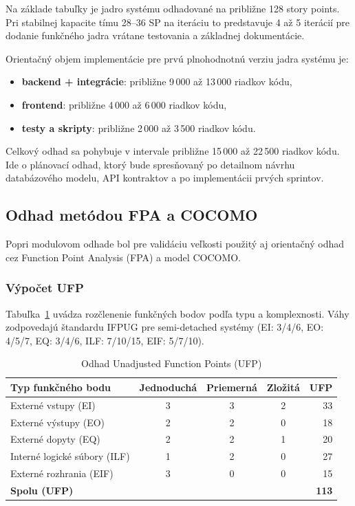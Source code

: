 Na základe tabuľky je jadro systému odhadované na približne 128 story points. Pri stabilnej kapacite tímu 28--36 SP na iteráciu to predstavuje 4 až 5 iterácií pre dodanie funkčného jadra vrátane testovania a základnej dokumentácie.

Orientačný objem implementácie pre prvú plnohodnotnú verziu jadra systému je:

\begin{itemize}
\item \textbf{backend + integrácie}: približne 9\,000 až 13\,000 riadkov kódu,
\item \textbf{frontend}: približne 4\,000 až 6\,000 riadkov kódu,
\item \textbf{testy a skripty}: približne 2\,000 až 3\,500 riadkov kódu.
\end{itemize}

Celkový odhad sa pohybuje v intervale približne 15\,000 až 22\,500 riadkov kódu. Ide o plánovací odhad, ktorý bude spresňovaný po detailnom návrhu databázového modelu, API kontraktov a po implementácii prvých sprintov.

\subsection{Odhad metódou FPA a COCOMO}

Popri modulovom odhade bol pre validáciu veľkosti použitý aj orientačný odhad cez Function Point Analysis (FPA) a model COCOMO.

\subsubsection*{Výpočet UFP}

Tabuľka~\ref{tab:ufp} uvádza rozčlenenie funkčných bodov podľa typu a komplexnosti. Váhy zodpovedajú štandardu IFPUG pre semi-detached systémy (EI: 3/4/6, EO: 4/5/7, EQ: 3/4/6, ILF: 7/10/15, EIF: 5/7/10).

\begin{table}[htbp]
\centering
\caption{Odhad Unadjusted Function Points (UFP)}
\label{tab:ufp}
\small
\begin{tabular}{l c c c r}
\toprule
Typ funkčného bodu & Jednoduchá & Priemerná & Zložitá & UFP \\
\midrule
Externé vstupy (EI) & 3 & 3 & 2 & 33 \\
Externé výstupy (EO) & 2 & 2 & 0 & 18 \\
Externé dopyty (EQ) & 2 & 2 & 1 & 20 \\
Interné logické súbory (ILF) & 1 & 2 & 0 & 27 \\
Externé rozhrania (EIF) & 3 & 0 & 0 & 15 \\
\midrule
\textbf{Spolu (UFP)} & & & & \textbf{113} \\
\bottomrule
\end{tabular}
\end{table}

